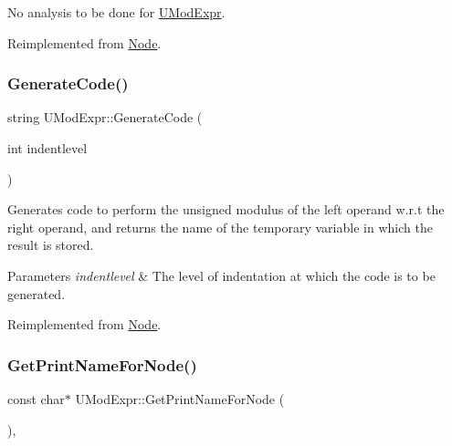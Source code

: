 No analysis to be done for \hyperlink{class_u_mod_expr}{U\+Mod\+Expr}. 

Reimplemented from \hyperlink{class_node_a5f88d55c6f253a29def7ccc443d83d47}{Node}.

\mbox{\label{class_u_mod_expr_a4ffcbf4138165e41c64b5aa3197df086}} 
\subsubsection{\texorpdfstring{Generate\+Code()}{GenerateCode()}}
{\footnotesize\ttfamily string U\+Mod\+Expr\+::\+Generate\+Code (\begin{DoxyParamCaption}\item[{int}]{indentlevel }\end{DoxyParamCaption})\hspace{0.3cm}{\ttfamily [virtual]}}

Generates code to perform the unsigned modulus of the left operand w.\+r.\+t the right operand, and returns the name of the temporary variable in which the result is stored. 
\begin{DoxyParams}{Parameters}
{\em indentlevel} & The level of indentation at which the code is to be generated. \\
\hline
\end{DoxyParams}


Reimplemented from \hyperlink{class_node_acb60e526730e8436056375a3055c2c32}{Node}.

\mbox{\label{class_u_mod_expr_afd7d74abecfd12895ee20137c013729d}} 
\subsubsection{\texorpdfstring{Get\+Print\+Name\+For\+Node()}{GetPrintNameForNode()}}
{\footnotesize\ttfamily const char$\ast$ U\+Mod\+Expr\+::\+Get\+Print\+Name\+For\+Node (\begin{DoxyParamCaption}{ }\end{DoxyParamCaption})\hspace{0.3cm}{\ttfamily [inline]}, {\ttfamily [virtual]}}

